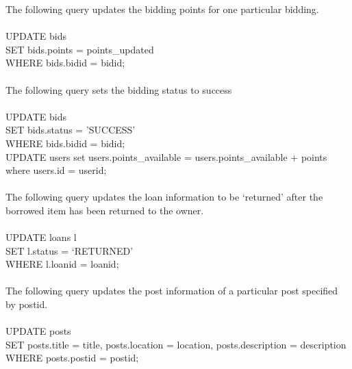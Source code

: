 The following query updates the bidding points for one particular bidding.\\\\
UPDATE bids\\
SET bids.points = points\_updated \\
WHERE bids.bidid = bidid;\\\\
The following query sets the bidding status to success\\\\
UPDATE bids\\
SET bids.status = 'SUCCESS'\\
WHERE bids.bidid = bidid;\\
UPDATE users set users.points\_available = users.points\_available + points where users.id = userid;\\\\
The following query updates the loan information to be `returned' after the borrowed item has been returned to the owner.\\\\
UPDATE loans l\\
SET l.status = `RETURNED'\\
WHERE l.loanid = loanid;\\\\
The following query updates the post information of a particular post specified by postid.\\\\
UPDATE posts\\
SET posts.title = title, posts.location = location, posts.description = description\\
WHERE posts.postid = postid;

